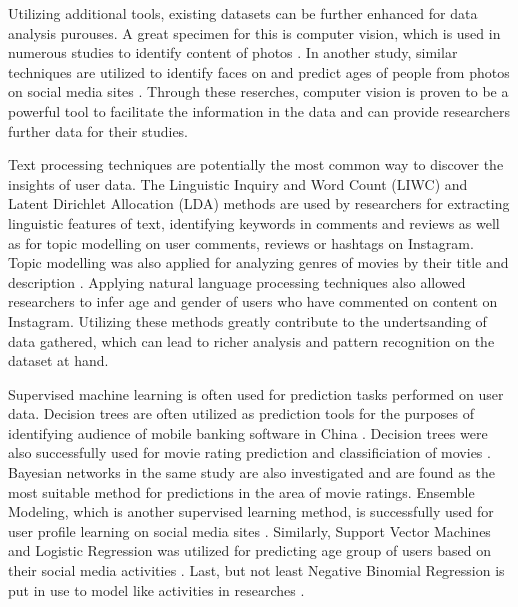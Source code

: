   Utilizing additional tools, existing datasets can be further enhanced for data analysis purouses. A great specimen for this is computer vision, which is used in numerous studies to identify content of photos \cite{hu2014we, farseev2015harvestingmultiplesources}. In another study, similar techniques are utilized to identify faces on and predict ages of people from photos on social media sites \cite{han2016teensarefrommars, bakhshi2014faces}. Through these reserches, computer vision is proven to be a powerful tool to facilitate the information in the data and can provide researchers further data for their studies. 

  Text processing techniques are potentially the most common way to discover the insights of user data. The Linguistic Inquiry and Word Count (LIWC) and Latent Dirichlet Allocation (LDA) methods are used by researchers \cite{ottoni2013ladies, farseev2015harvestingmultiplesources, jang2016teensengagemorewithfewerphotos} for extracting linguistic features of text, identifying keywords in comments and reviews as well as for topic modelling on user comments, reviews or hashtags on Instagram. Topic modelling was also applied for analyzing genres of movies by their title and description \cite{kabinsingha2012movie}. Applying natural language processing techniques also allowed researchers to infer age and gender of users \cite{han2016teensarefrommars} who have commented on content on Instagram. Utilizing these methods greatly contribute to the undertsanding of data gathered, which can lead to richer analysis and pattern recognition on the dataset at hand.
   
  Supervised machine learning is often used for prediction tasks performed on user data. Decision trees are often utilized as prediction tools for the purposes of identifying audience of mobile banking software in China \cite{chinesemobilebankingusers}. Decision trees were also successfully used for movie rating prediction \cite{saraee2004data} and classificiation of movies \cite{kabinsingha2012movie}. Bayesian networks in the same study \cite{kabinsingha2012movie} are also investigated and are found as the most suitable method for predictions in the area of movie ratings. Ensemble Modeling, which is another supervised learning method, is successfully used for user profile learning on social media sites \cite{farseev2015harvestingmultiplesources}. Similarly, Support Vector Machines and Logistic Regression was utilized for predicting age group of users based on their social media activities \cite{han2016teensarefrommars}. Last, but not least Negative Binomial Regression is put in use to model like activities in researches \cite{jang2015no, bakhshi2014faces}.

